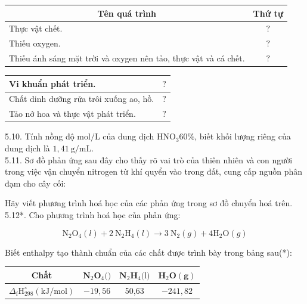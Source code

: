 \documentclass[10pt]{article}
\begin{document}
\begin{center}
\begin{tabular}{|l|c|}
\hline
\multicolumn{1}{|c|}{Tên quá trình} & Thứ tự \\
\hline
Thực vật chết. & $?$ \\
\hline
Thiếu oxygen. & $?$ \\
\hline
Thiếu ánh sáng mặt trời và oxygen nên tảo, thực vật và cá chết. & $?$ \\
\hline
\end{tabular}
\end{center}

\begin{center}
\begin{tabular}{|l|l|}
\hline
Vi khuẩn phát triển. & $?$ \\
\hline
Chất dinh dưỡng rửa trôi xuống ao, hồ. & $?$ \\
\hline
Tảo nở hoa và thực vật phát triển. & $?$ \\
\hline
\end{tabular}
\end{center}

5.10. Tính nồng độ $\mathrm{mol} / \mathrm{L}$ của dung dịch $\mathrm{HNO}_{3} 60 \%$, biết khối lượng riêng của dung dịch là $1,41 \mathrm{~g} / \mathrm{mL}$.\\
5.11. Sơ đồ phản ứng sau đây cho thấy rõ vai trò của thiên nhiên và con người trong việc vận chuyển nitrogen từ khí quyển vào trong đất, cung cấp nguồn phân đạm cho cây cối:

Hãy viết phương trình hoá học của các phản ứng trong sơ đồ chuyển hoá trên.\\
5.12*. Cho phương trình hoá học của phản ứng:

$$
\mathrm{N}_{2} \mathrm{O}_{4}(l)+2 \mathrm{~N}_{2} \mathrm{H}_{4}(l) \rightarrow 3 \mathrm{~N}_{2}(g)+4 \mathrm{H}_{2} \mathrm{O}(g)
$$

Biết enthalpy tạo thành chuẩn của các chất được trình bày trong bảng sau(*):

\begin{center}
\begin{tabular}{|c|c|c|c|}
\hline
Chất & $\mathbf{N}_{2} \mathbf{O}_{4} \boldsymbol{(} \boldsymbol{)}$ & $\mathbf{N}_{2} \mathbf{H}_{4} \boldsymbol{(} \boldsymbol{\mathrm { l }} \boldsymbol{)}$ & $\mathbf{H}_{2} \mathbf{O}(\mathbf{g})$ \\
\hline
$\Delta_{\mathrm{f}} \mathrm{H}_{298}^{\circ}(\mathrm{kJ} / \mathrm{mol})$ & $-19,56$ & 50,63 & $-241,82$ \\
\hline
\end{tabular}
\end{center}
\end{document}
